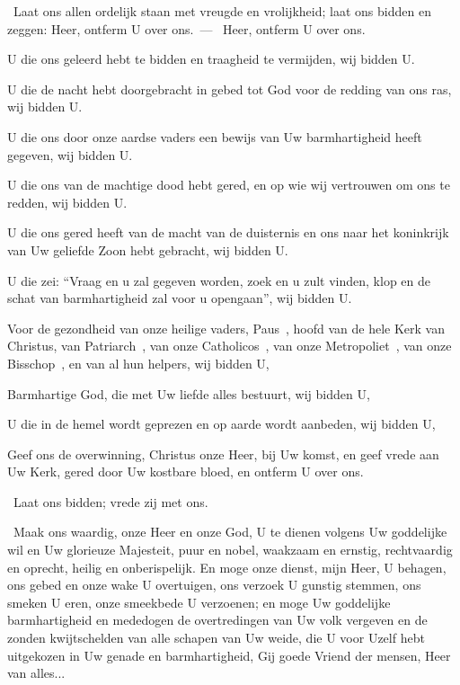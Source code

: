 \documentclass[12pt,twoside,a5paper]{article}
\begin{document}


\begin{halfparskip}
  \dd~Laat ons allen ordelijk staan met vreugde en vrolijkheid; laat ons bidden en zeggen: Heer, ontferm U over ons.~--- \rr~Heer, ontferm U over ons. 

  U die ons geleerd hebt te bidden en traagheid te vermijden, wij bidden U.

  U die de nacht hebt doorgebracht in gebed tot God voor de redding van ons ras, wij bidden U.

  U die ons door onze aardse vaders een bewijs van Uw barmhartigheid heeft gegeven, wij bidden U.

  U die ons van de machtige dood hebt gered, en op wie wij vertrouwen om ons te redden, wij bidden U.

  U die ons gered heeft van de macht van de duisternis en ons naar het koninkrijk van Uw geliefde Zoon hebt gebracht, wij bidden U.

  U die zei: ``Vraag en u zal gegeven worden, zoek en u zult vinden, klop en de schat van barmhartigheid zal voor u opengaan'', wij bidden U.

  Voor de gezondheid van onze heilige vaders, Paus~\NN , hoofd van de hele Kerk van Christus, van Patriarch~\NN , van onze Catholicos~\NN , van onze Metropoliet~\NN , van onze Bisschop~\NN , en van al hun helpers, wij bidden U,

  Barmhartige God, die met Uw liefde alles bestuurt, wij bidden U,

  U die in de hemel wordt geprezen en op aarde wordt aanbeden, wij bidden U,

  Geef ons de overwinning, Christus onze Heer, bij Uw komst, en geef vrede aan Uw Kerk, gered door Uw kostbare bloed, en ontferm U over ons.

   \dd~Laat ons bidden; vrede zij met ons.

  \cc~Maak ons waardig, onze Heer en onze God, U te dienen volgens Uw goddelijke wil en Uw glorieuze Majesteit, puur en nobel, waakzaam en ernstig, rechtvaardig en oprecht, heilig en onberispelijk. En moge onze dienst, mijn Heer, U behagen, ons gebed en onze wake U overtuigen, ons verzoek U gunstig stemmen, ons smeken U eren, onze smeekbede U verzoenen; en moge Uw goddelijke barmhartigheid en mededogen de overtredingen van Uw volk vergeven en de zonden kwijtschelden van alle schapen van Uw weide, die U voor Uzelf hebt uitgekozen in Uw genade en barmhartigheid, Gij goede Vriend der mensen, Heer van alles...
\end{halfparskip}

\end{document}
